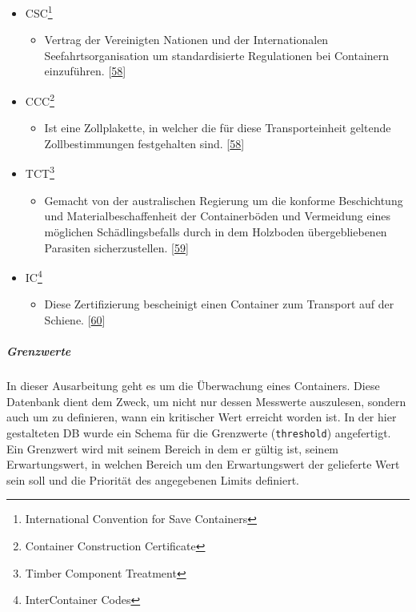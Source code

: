 \documentclass[
    headings=optiontotocandhead,%
    twoside,
    numbers=noenddot,%
    12pt, %
    titlepage, %
    parskip=full, %
    listof=leveldown, 
    numbers=noenddot, %
    a4paper,DIV=14,
    BCOR=15mm,
]{scrbook}
\newcommand{\passthrough}[1]{#1}
\providecommand{\tightlist}{%
  \setlength{\itemsep}{0pt}\setlength{\parskip}{0pt}}
\begin{document}
\begin{itemize}
\tightlist
\item
  CSC\footnote{International Convention for Save Containers}

  \begin{itemize}
  \tightlist
  \item
    Vertrag der Vereinigten Nationen und der Internationalen
    Seefahrtsorganisation um standardisierte Regulationen bei Containern
    einzuführen. {[}\protect\hyperlink{ref-bic-code-csc}{58}{]}
  \end{itemize}
\item
  CCC\footnote{Container Construction Certificate}

  \begin{itemize}
  \tightlist
  \item
    Ist eine Zollplakette, in welcher die für diese Transporteinheit
    geltende Zollbestimmungen festgehalten sind.
    {[}\protect\hyperlink{ref-bic-code-csc}{58}{]}
  \end{itemize}
\item
  TCT\footnote{Timber Component Treatment}

  \begin{itemize}
  \tightlist
  \item
    Gemacht von der australischen Regierung um die konforme Beschichtung
    und Materialbeschaffenheit der Containerböden und Vermeidung eines
    möglichen Schädlingsbefalls durch in dem Holzboden übergebliebenen
    Parasiten sicherzustellen. {[}\protect\hyperlink{ref-tct}{59}{]}
  \end{itemize}
\item
  IC\footnote{InterContainer Codes}

  \begin{itemize}
  \tightlist
  \item
    Diese Zertifizierung bescheinigt einen Container zum Transport auf
    der Schiene. {[}\protect\hyperlink{ref-ic-codes}{60}{]}
  \end{itemize}
\end{itemize}

\hypertarget{grenzwerte}{%
\subparagraph{Grenzwerte}\label{grenzwerte}}

In dieser Ausarbeitung geht es um die Überwachung eines Containers.
Diese Datenbank dient dem Zweck, um nicht nur dessen Messwerte
auszulesen, sondern auch um zu definieren, wann ein kritischer Wert
erreicht worden ist. In der hier gestalteten DB wurde ein Schema für die
Grenzwerte (\passthrough{\lstinline!threshold!}) angefertigt. Ein
Grenzwert wird mit seinem Bereich in dem er gültig ist, seinem
Erwartungswert, in welchen Bereich um den Erwartungswert der gelieferte
Wert sein soll und die Priorität des angegebenen Limits definiert.
\end{document}
